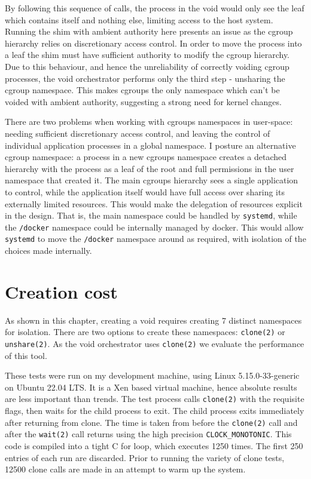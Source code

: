 \documentclass[12pt,a4paper,twoside]{report}
\begin{document}
By following this sequence of calls, the process in the void would only see the leaf which contains itself and nothing else, limiting access to the host system. Running the shim with ambient authority here presents an issue as the cgroup hierarchy relies on discretionary access control. In order to move the process into a leaf the shim must have sufficient authority to modify the cgroup hierarchy. Due to this behaviour, and hence the unreliability of correctly voiding cgroup processes, the void orchestrator performs only the third step - unsharing the cgroup namespace. This makes cgroups the only namespace which can't be voided with ambient authority, suggesting a strong need for kernel changes.

There are two problems when working with cgroups namespaces in user-space: needing sufficient discretionary access control, and leaving the control of individual application processes in a global namespace. I posture an alternative cgroup namespace: a process in a new cgroups namespace creates a detached hierarchy with the process as a leaf of the root and full permissions in the user namespace that created it. The main cgroups hierarchy sees a single application to control, while the application itself would have full access over sharing its externally limited resources. This would make the delegation of resources explicit in the design. That is, the main namespace could be handled by \texttt{systemd}, while the \texttt{/docker} namespace could be internally managed by docker. This would allow \texttt{systemd} to move the \texttt{/docker} namespace around as required, with isolation of the choices made internally.

\section{Creation cost}
\label{sec:void-creation-costs}

As shown in this chapter, creating a void requires creating 7 distinct namespaces for isolation. There are two options to create these namespaces: \texttt{clone(2)} or \texttt{unshare(2)}. As the void orchestrator uses \texttt{clone(2)} we evaluate the performance of this tool.

These tests were run on my development machine, using Linux 5.15.0-33-generic on Ubuntu 22.04 LTS. It is a Xen based virtual machine, hence absolute results are less important than trends. The test process calls \texttt{clone(2)} with the requisite flags, then waits for the child process to exit. The child process exits immediately after returning from clone. The time is taken from before the \texttt{clone(2)} call and after the \texttt{wait(2)} call returns using the high precision \texttt{CLOCK\_MONOTONIC}. This code is compiled into a tight C for loop, which executes 1250 times. The first 250 entries of each run are discarded. Prior to running the variety of clone tests, 12500 clone calls are made in an attempt to warm up the system.
\end{document}
